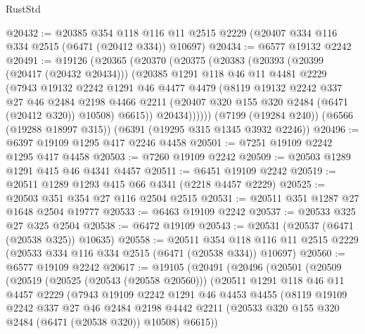 \begin{lexlean}{RustStd}
\begin{coremodule}
@20432 := @20385
    @354
    @118
    @116
    @11
    @2515
    @2229
    (@20407 @334 @116 @334 @2515 (@6471 (@20412 @334)) @10697)
@20434 := @6577 @19132 @2242
@20491 := @19126
    (@20365
      (@20370
        (@20375
          (@20383
            (@20393
              (@20399 (@20417 (@20432 @20434)))
              (@20385
                @1291
                @118
                @46
                @11
                @4481
                @2229
                (@7943
                  @19132
                  @2242
                  @1291
                  @46
                  @4477
                  @4479
                  (@8119
                    @19132
                    @2242
                    @337
                    @27
                    @46
                    @2484
                    @2198
                    @4466
                    @2211
                    (@20407 @320 @155 @320 @2484 (@6471 (@20412 @320)) @10508)
                    @6615))
                @20434))))))
    (@7199 (@19284 @240))
    (@6566 (@19288 @18997 @315))
    (@6391 (@19295 @315 @1345 @3932 @2246))
@20496 := @6397 @19109 @1295 @417 @2246 @4458
@20501 := @7251 @19109 @2242 @1295 @417 @4458
@20503 := @7260 @19109 @2242
@20509 := @20503 @1289 @1291 @415 @46 @4341 @4457
@20511 := @6451 @19109 @2242
@20519 := @20511 @1289 @1293 @415 @66 @4341 (@2218 @4457 @2229)
@20525 := @20503 @351 @354 @27 @116 @2504 @2515
@20531 := @20511 @351 @1287 @27 @1648 @2504 @19777
@20533 := @6463 @19109 @2242
@20537 := @20533 @325 @27 @325 @2504
@20538 := @6472 @19109
@20543 := @20531 (@20537 (@6471 (@20538 @325)) @10635)
@20558 := @20511
    @354
    @118
    @116
    @11
    @2515
    @2229
    (@20533 @334 @116 @334 @2515 (@6471 (@20538 @334)) @10697)
@20560 := @6577 @19109 @2242
@20617 := @19105
    (@20491
      (@20496
        (@20501
          (@20509
            (@20519
              (@20525 (@20543 (@20558 @20560)))
              (@20511
                @1291
                @118
                @46
                @11
                @4457
                @2229
                (@7943
                  @19109
                  @2242
                  @1291
                  @46
                  @4453
                  @4455
                  (@8119
                    @19109
                    @2242
                    @337
                    @27
                    @46
                    @2484
                    @2198
                    @4442
                    @2211
                    (@20533 @320 @155 @320 @2484 (@6471 (@20538 @320)) @10508)
                    @6615))

\end{coremodule}
\end{lexlean}
